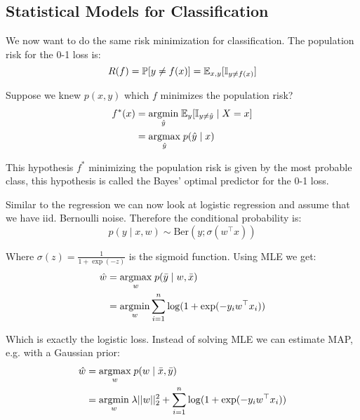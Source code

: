\subsection{Statistical Models for Classification}

We now want to do the same risk minimization for classification. The population risk for the 0-1 loss is:
$$R(f) = \mathbb P[y \neq f(x)] = \mathbb{E}_{x,y}[\mathbb I_{y \neq f(x)}]$$

Suppose we knew $p(x,y)$ which $f$ minimizes the population risk?
\begin{align*}
	f^*(x) &= \underset{\hat y}{\text{argmin}} \; \mathbb{E}_y [\mathbb I_{y \neq \hat y} \; | \; X = x] \\
	&= \underset{\hat y}{\text{argmax}} \; p(\hat y \; | \; x)
\end{align*}

This hypothesis $f^*$ minimizing the population risk is given by the most probable class, this hypothesis is called the Bayes' optimal predictor for the 0-1 loss.

Similar to the regression we can now look at logistic regression and assume that we have iid. Bernoulli noise. Therefore the conditional probability is:
$$p(y \; | \; x,w) \sim \text{Ber}(y; \sigma(w^\top x))$$

Where $\sigma(z) = \frac{1}{1 + \exp(-z)}$ is the sigmoid function. Using MLE we get:
\begin{align*}
	\hat w &= \underset{w}{\text{argmax}} \; p(\bar y \; | \; w, \bar x) \\
	&= \underset{w}{\text{argmin}} \sum_{i = 1}^n \log (1 + \exp(-y_i w^\top x_i))
\end{align*}

Which is exactly the logistic loss. Instead of solving MLE we can estimate MAP, e.g. with a Gaussian prior:
\begin{align*}
	\hat w &= \underset{w}{\text{argmax}} \; p(w \; | \; \bar x, \bar y) \\
	&= \underset{w}{\text{argmin}} \; \lambda ||w||_2^2 + \sum_{i = 1}^n \log (1 + \exp(-y_i w^\top x_i))
\end{align*}






